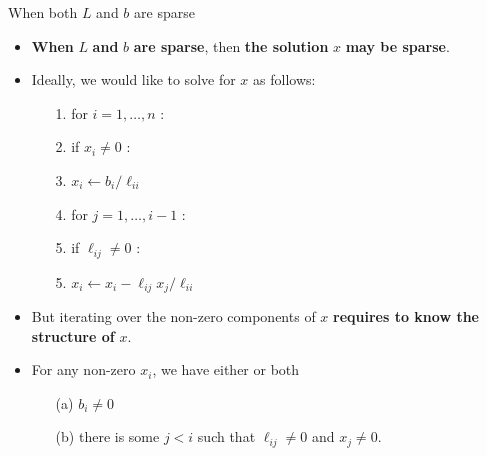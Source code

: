 \documentclass[t,usepdftitle=false]{beamer}
\begin{document}
\begin{frame}{When both $L$ and $b$ are sparse}
\begin{itemize}
\item \textbf{When} $L$ \textbf{and} $b$ \textbf{are sparse}, then \textbf{the solution} $x$ \textbf{may be sparse}.
\item Ideally, we would like to solve for $x$ as follows:
\vspace{.1cm}
\begin{itemize}
\item[1.] for $i=1,\dots,n$ :\vspace{.1cm}
\item[2.]\hspace{.4cm}if $x_i\neq 0$ :\vspace{.1cm}
\item[3.]\hspace{.8cm}$x_i\leftarrow b_i/\ell_{ii}$\vspace{.1cm}
\item[4.]\hspace{.8cm}for $j=1,\dots,i-1$ :\vspace{.1cm} 
\item[5.]\hspace{1.2cm}if $\ell_{ij}\neq 0$ :\vspace{.1cm}
\item[5.]\hspace{1.6cm}$x_i\leftarrow x_i-\ell_{ij}x_j/\ell_{ii}$
\end{itemize}
\vspace{.1cm}
\item But iterating over the non-zero components of $x$ \textbf{requires to know the structure of} $x$.
\item For any non-zero $x_i$, we have either or both
\begin{itemize}
\item[(a)] $b_i\neq 0$ \vspace{.1cm}
\item[(b)] there is some $j<i$ such that $\ell_{ij}\neq 0$ and $x_j\neq 0$.
\end{itemize}
\end{itemize}
\end{frame}
\end{document}
